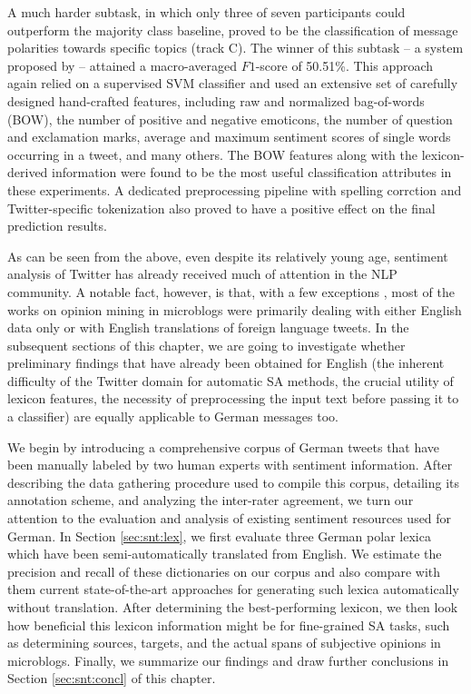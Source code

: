 A much harder subtask, in which only three of seven participants could
outperform the majority class baseline, proved to be the
classification of message polarities towards specific topics (track
C).  The winner of this subtask -- a system proposed by
\citet{Boag:15} -- attained a macro-averaged $F1$-score of 50.51\%.
This approach again relied on a supervised SVM classifier and used an
extensive set of carefully designed hand-crafted features, including
raw and normalized bag-of-words (BOW), the number of positive and
negative emoticons, the number of question and exclamation marks,
average and maximum sentiment scores of single words occurring in a
tweet, and many others.  The BOW features along with the
lexicon-derived information were found to be the most useful
classification attributes in these experiments.  A dedicated
preprocessing pipeline with spelling corrction and Twitter-specific
tokenization also proved to have a positive effect on the final
prediction results.

As can be seen from the above, even despite its relatively young age,
sentiment analysis of Twitter has already received much of attention
in the NLP community.  A notable fact, however, is that, with a few
exceptions \cite{Basile:13,Araque:15,Cesteros:15}, most of the works
on opinion mining in microblogs were primarily dealing with either
English data only or with English translations of foreign language
tweets.  In the subsequent sections of this chapter, we are going to
investigate whether preliminary findings that have already been
obtained for English (the inherent difficulty of the Twitter domain
for automatic SA methods, the crucial utility of lexicon features, the
necessity of preprocessing the input text before passing it to a
classifier) are equally applicable to German messages too.

We begin by introducing a comprehensive corpus of German tweets that
have been manually labeled by two human experts with sentiment
information.  After describing the data gathering procedure used to
compile this corpus, detailing its annotation scheme, and analyzing
the inter-rater agreement, we turn our attention to the evaluation and
analysis of existing sentiment resources used for German.  In Section
\ref{sec:snt:lex}, we first evaluate three German polar lexica which
have been semi-automatically translated from English.  We estimate the
precision and recall of these dictionaries on our corpus and also
compare with them current state-of-the-art approaches for generating
such lexica automatically without translation.  After determining the
best-performing lexicon, we then look how beneficial this lexicon
information might be for fine-grained SA tasks, such as determining
sources, targets, and the actual spans of subjective opinions in
microblogs.  Finally, we summarize our findings and draw further
conclusions in Section \ref{sec:snt:concl} of this chapter.
\newpage

